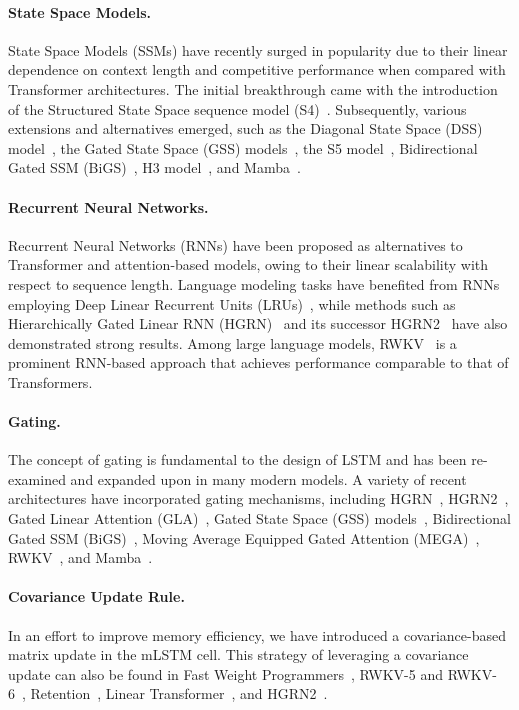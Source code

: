 \paragraph{State Space Models.} State Space Models (SSMs) have recently surged in popularity due to their linear dependence on context length and competitive performance when compared with Transformer architectures. The initial breakthrough came with the introduction of the Structured State Space sequence model (S4)~\citep{Gu:21}. Subsequently, various extensions and alternatives emerged, such as the Diagonal State Space (DSS) model~\citep{Gupta:22}, the Gated State Space (GSS) models~\citep{Mehta:22}, the S5 model~\citep{Smith:22}, Bidirectional Gated SSM (BiGS)~\citep{Wang:22}, H3 model~\citep{Fu:23}, and Mamba~\citep{Gu:24arxiv}.

\paragraph{Recurrent Neural Networks.} Recurrent Neural Networks (RNNs) have been proposed as alternatives to Transformer and attention-based models, owing to their linear scalability with respect to sequence length. Language modeling tasks have benefited from RNNs employing Deep Linear Recurrent Units (LRUs)~\citep{Orvieto:23, De:24arxiv}, while methods such as Hierarchically Gated Linear RNN (HGRN)~\citep{Qin:23} and its successor HGRN2~\citep{Qin:24arxiv} have also demonstrated strong results. Among large language models, RWKV~\citep{Peng:23arxivshort,Peng:24arxivshort} is a prominent RNN-based approach that achieves performance comparable to that of Transformers.

\paragraph{Gating.}
The concept of gating is fundamental to the design of LSTM and has been re-examined and expanded upon in many modern models. A variety of recent architectures have incorporated gating mechanisms, including HGRN~\citep{Qin:23}, HGRN2~\citep{Qin:24arxiv}, Gated Linear Attention (GLA)~\citep{Yang:23arxiv}, Gated State Space (GSS) models~\citep{Mehta:22}, Bidirectional Gated SSM (BiGS)~\citep{Wang:22}, Moving Average Equipped Gated Attention (MEGA)~\citep{Ma:22}, RWKV~\citep{Peng:23arxivshort}, and Mamba~\citep{Gu:24arxiv}.

\paragraph{Covariance Update Rule.}
In an effort to improve memory efficiency, we have introduced a covariance-based matrix update in the mLSTM cell. This strategy of leveraging a covariance update can also be found in Fast Weight Programmers~\citep{Schmidhuber:92ncfastweights,Schlag:21}, RWKV-5 and RWKV-6~\citep{Peng:24arxivshort}, Retention~\citep{Sun:23arxiv}, Linear Transformer~\citep{Katharopoulos:20}, and HGRN2~\citep{Qin:24arxiv}.

